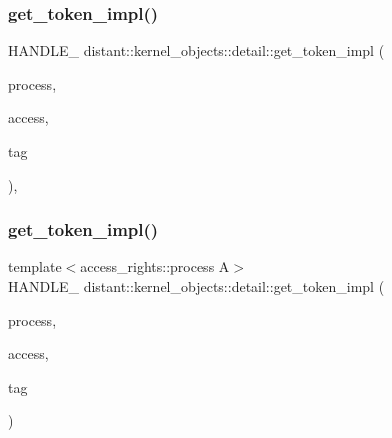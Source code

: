 \subsubsection{\texorpdfstring{get\+\_\+token\+\_\+impl()}{get\_token\_impl()}\hspace{0.1cm}{\footnotesize\ttfamily [1/2]}}
{\footnotesize\ttfamily H\+A\+N\+D\+L\+E\+\_\+ distant\+::kernel\+\_\+objects\+::detail\+::get\+\_\+token\+\_\+impl (\begin{DoxyParamCaption}\item[{const \mbox{\hyperlink{classdistant_1_1kernel__objects_1_1process__base}{process\+\_\+base}} \&}]{process,  }\item[{const D\+W\+O\+R\+D\+\_\+}]{access,  }\item[{const \mbox{\hyperlink{classdistant_1_1detail_1_1process__base__tag}{distant\+::detail\+::process\+\_\+base\+\_\+tag}}}]{tag }\end{DoxyParamCaption})\hspace{0.3cm}{\ttfamily [inline]}, {\ttfamily [noexcept]}}

\mbox{\label{namespacedistant_1_1kernel__objects_1_1detail_af72f187b82462d74361d8602c799f779}} 
\subsubsection{\texorpdfstring{get\+\_\+token\+\_\+impl()}{get\_token\_impl()}\hspace{0.1cm}{\footnotesize\ttfamily [2/2]}}
{\footnotesize\ttfamily template$<$access\+\_\+rights\+::process A$>$ \\
H\+A\+N\+D\+L\+E\+\_\+ distant\+::kernel\+\_\+objects\+::detail\+::get\+\_\+token\+\_\+impl (\begin{DoxyParamCaption}\item[{const \mbox{\hyperlink{classdistant_1_1kernel__objects_1_1process}{process}}$<$ A $>$ \&}]{process,  }\item[{const D\+W\+O\+R\+D\+\_\+}]{access,  }\item[{const \mbox{\hyperlink{classdistant_1_1detail_1_1process__tag}{distant\+::detail\+::process\+\_\+tag}}}]{tag }\end{DoxyParamCaption})\hspace{0.3cm}{\ttfamily [noexcept]}}

